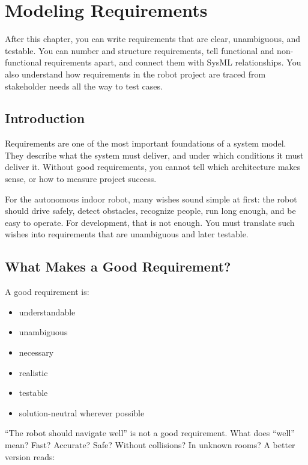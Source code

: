 \chapter{Modeling Requirements}

\begin{lernziele}
After this chapter, you can write requirements that are clear, unambiguous, and testable. You can number and structure requirements, tell functional and non-functional requirements apart, and connect them with SysML relationships. You also understand how requirements in the robot project are traced from stakeholder needs all the way to test cases.
\end{lernziele}

\section{Introduction}
Requirements are one of the most important foundations of a system model. They describe what the system must deliver, and under which conditions it must deliver it. Without good requirements, you cannot tell which architecture makes sense, or how to measure project success.

For the autonomous indoor robot, many wishes sound simple at first: the robot should drive safely, detect obstacles, recognize people, run long enough, and be easy to operate. For development, that is not enough. You must translate such wishes into requirements that are unambiguous and later testable.

\section{What Makes a Good Requirement?}
A good requirement is:

\begin{itemize}
    \item understandable
    \item unambiguous
    \item necessary
    \item realistic
    \item testable
    \item solution-neutral wherever possible
\end{itemize}

\enquote{The robot should navigate well} is not a good requirement. What does \enquote{well} mean? Fast? Accurate? Safe? Without collisions? In unknown rooms? A better version reads:

